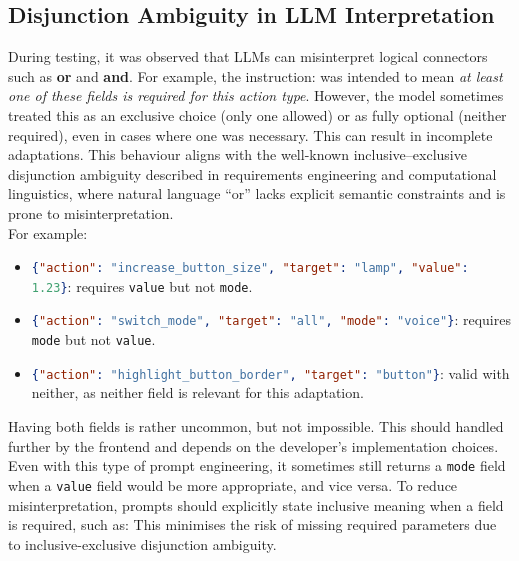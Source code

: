 \subsection{Disjunction Ambiguity in LLM Interpretation}
During testing, it was observed that LLMs can misinterpret logical connectors such as \textbf{or} and \textbf{and}. For example, the instruction:
was intended to mean \textit{at least one of these fields is required for this action type}. However, the model sometimes treated this as an exclusive choice (only one allowed) or as fully optional (neither required), even in cases where one was necessary. This can result in incomplete adaptations. This behaviour aligns with the well-known inclusive–exclusive disjunction ambiguity described in requirements engineering and computational linguistics, where natural language “or” lacks explicit semantic constraints and is prone to misinterpretation. \\
For example:
\begin{itemize}
    \item \lstinline[language=json]|{"action": "increase_button_size", "target": "lamp", "value": 1.23}|: requires \texttt{value} but not \texttt{mode}.
    \item \lstinline[language=json]|{"action": "switch_mode", "target": "all", "mode": "voice"}|: requires \texttt{mode} but not \texttt{value}.
    \item \lstinline[language=json]|{"action": "highlight_button_border", "target": "button"}|: valid with neither, as neither field is relevant for this adaptation.
\end{itemize}
Having both fields is rather uncommon, but not impossible. This should handled further by the frontend and depends on the developer's implementation choices. Even with this type of prompt engineering, it sometimes still returns a \texttt{mode} field when a \texttt{value} field would be more appropriate, and vice versa.
To reduce misinterpretation, prompts should explicitly state inclusive meaning when a field is required, such as:
This minimises the risk of missing required parameters due to inclusive-exclusive disjunction ambiguity.

